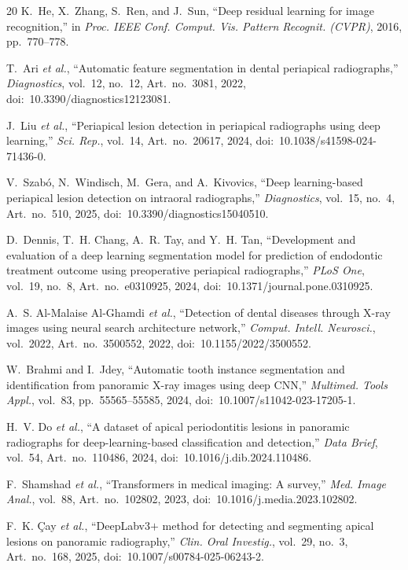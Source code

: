 \documentclass[conference]{IEEEtran}
\begin{document}
\begin{thebibliography}{20}
K.~He, X.~Zhang, S.~Ren, and J.~Sun,
``Deep residual learning for image recognition,''
in \textit{Proc. IEEE Conf. Comput. Vis. Pattern Recognit. (CVPR)}, 2016,
pp.~770--778.

T.~Ari \textit{et al.},
``Automatic feature segmentation in dental periapical radiographs,''
\textit{Diagnostics}, vol.~12, no.~12, Art.\ no.~3081, 2022,
doi:~10.3390/diagnostics12123081.

J.~Liu \textit{et al.},
``Periapical lesion detection in periapical radiographs using deep learning,''
\textit{Sci. Rep.}, vol.~14, Art.\ no.~20617, 2024,
doi:~10.1038/s41598-024-71436-0.

V.~Szab\'{o}, N.~Windisch, M.~Gera, and A.~Kivovics,
``Deep learning-based periapical lesion detection on intraoral radiographs,''
\textit{Diagnostics}, vol.~15, no.~4, Art.\ no.~510, 2025,
doi:~10.3390/diagnostics15040510.

D.~Dennis, T.~H. Chang, A.~R. Tay, and Y.~H. Tan,
``Development and evaluation of a deep learning segmentation model for
prediction of endodontic treatment outcome using preoperative periapical
radiographs,''
\textit{PLoS One}, vol.~19, no.~8, Art.\ no.~e0310925, 2024,
doi:~10.1371/journal.pone.0310925.

A.~S. Al-Malaise Al-Ghamdi \textit{et al.},
``Detection of dental diseases through X-ray images using neural search
architecture network,''
\textit{Comput.%
 Intell. Neurosci.}, vol.~2022, Art.\ no.~3500552, 2022,
doi:~10.1155/2022/3500552.

W.~Brahmi and I.~Jdey,
``Automatic tooth instance segmentation and identification from panoramic
X-ray images using deep CNN,''
\textit{Multimed. Tools Appl.}, vol.~83, pp.~55565--55585, 2024,
doi:~10.1007/s11042-023-17205-1.

H.~V. Do \textit{et al.},
``A dataset of apical periodontitis lesions in panoramic radiographs for
deep-learning-based classification and detection,''
\textit{Data Brief}, vol.~54, Art.\ no.~110486, 2024,
doi:~10.1016/j.dib.2024.110486.

F.~Shamshad \textit{et al.},
``Transformers in medical imaging: A survey,''
\textit{Med. Image Anal.}, vol.~88, Art.\ no.~102802, 2023,
doi:~10.1016/j.media.2023.102802.

F.~K. \c{C}ay \textit{et al.},
``DeepLabv3$+$ method for detecting and segmenting apical lesions on
panoramic radiography,''
\textit{Clin. Oral Investig.}, vol.~29, no.~3, Art.\ no.~168, 2025,
doi:~10.1007/s00784-025-06243-2.


\end{thebibliography}
\end{document}
